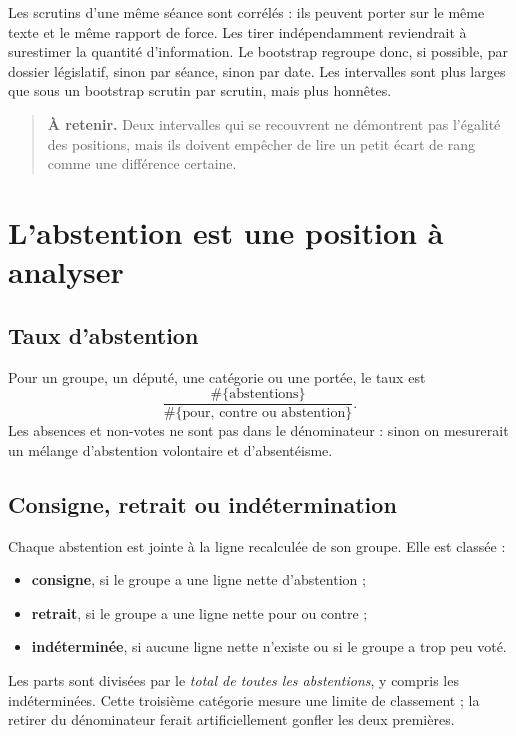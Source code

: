 \documentclass[11pt,a4paper]{article}
\newcommand{\important}[1]{\begin{quote}\small\color{blue!55!black}\textbf{À retenir.} #1\end{quote}}
\begin{document}
Les scrutins d'une même séance sont corrélés : ils peuvent porter sur le même
texte et le même rapport de force. Les tirer indépendamment reviendrait à
surestimer la quantité d'information. Le bootstrap regroupe donc, si possible,
par dossier législatif, sinon par séance, sinon par date. Les intervalles sont
plus larges que sous un bootstrap scrutin par scrutin, mais plus honnêtes.

\important{Deux intervalles qui se recouvrent ne démontrent pas l'égalité des
positions, mais ils doivent empêcher de lire un petit écart de rang comme une
différence certaine.}

\section{L'abstention est une position à analyser}\label{sec:abstention}

\subsection{Taux d'abstention}

Pour un groupe, un député, une catégorie ou une portée, le taux est
\[
 \frac{\#\{\text{abstentions}\}}
 {\#\{\text{pour, contre ou abstention}\}}.
\]
Les absences et non-votes ne sont pas dans le dénominateur : sinon on mesurerait
un mélange d'abstention volontaire et d'absentéisme.

\subsection{Consigne, retrait ou indétermination}

Chaque abstention est jointe à la ligne recalculée de son groupe. Elle est
classée :

\begin{itemize}
  \item \textbf{consigne}, si le groupe a une ligne nette d'abstention ;
  \item \textbf{retrait}, si le groupe a une ligne nette pour ou contre ;
  \item \textbf{indéterminée}, si aucune ligne nette n'existe ou si le groupe a
  trop peu voté.
\end{itemize}

Les parts sont divisées par le \emph{total de toutes les abstentions}, y compris
les indéterminées. Cette troisième catégorie mesure une limite de classement ;
la retirer du dénominateur ferait artificiellement gonfler les deux premières.
\end{document}
